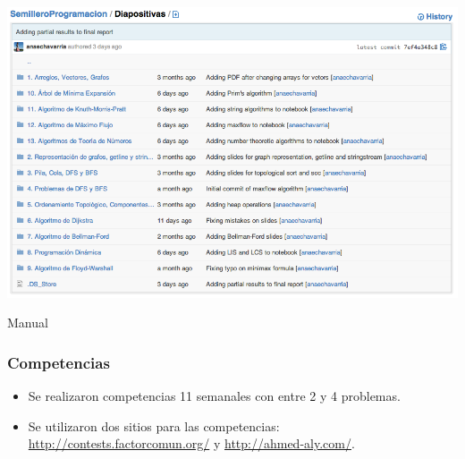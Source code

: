 \documentclass{beamer}
\begin{document}
	\begin{frame}
		\includegraphics[width = \textwidth]{./img/git2.png}
	\end{frame}
	
	\begin{frame}
		\begin{center}
			Manual
		\end{center}
	\end{frame}
	
	
	\begin{frame}
		\frametitle{Competencias}
		\begin{itemize}
			\item Se realizaron competencias 11 semanales con entre 2 y 4 problemas.
			\item Se utilizaron dos sitios para las competencias: \url{http://contests.factorcomun.org/} y \url{http://ahmed-aly.com/}.
		\end{itemize}
	\end{frame}
	
\end{document}
